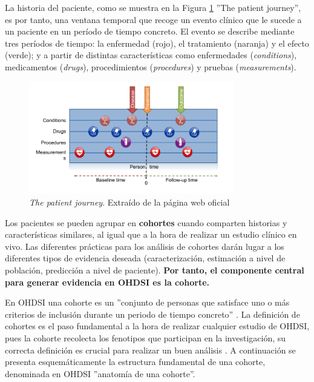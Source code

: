 La historia del paciente,  como se muestra en la Figura \ref{fig:patientJourney} ''The patient journey'', es por tanto, una ventana temporal que recoge un evento clínico que le sucede a un paciente en un período de tiempo concreto. El evento se describe mediante tres períodos de tiempo: la enfermedad (rojo), el tratamiento (naranja) y el efecto (verde); y a partir de distintas características como enfermedades (\textit{conditions}), medicamentos (\textit{drugs}), procedimientos (\textit{procedures}) y pruebas (\textit{measurements}).

\begin{figure}[H]
    \centering
    \includegraphics[width=0.80\textwidth]{figures/patientJourney.png}
     \caption{\textit{The patient journey}. Extraído de la página web oficial \cite{OHDSIbook}}
    \label{fig:patientJourney}
\end{figure}

Los pacientes se pueden agrupar en \textbf{cohortes} cuando comparten historias y características similares, al igual que a la hora de realizar un estudio clínico en vivo. Las diferentes  prácticas para los análisis de cohortes darán lugar a los diferentes tipos de evidencia deseada (caracterización, estimación a nivel de población, predicción a nivel de paciente). \textbf{Por tanto, el componente central para generar evidencia en OHDSI es la cohorte.}


En OHDSI una cohorte es un ''conjunto de personas que satisface uno o más criterios de inclusión durante un periodo de tiempo concreto'' \cite{OHDSIbook}. La definición de cohortes es el paso fundamental a la hora de realizar cualquier estudio de OHDSI, pues la cohorte recolecta los fenotipos que participan en la investigación, su correcta definición es crucial para realizar un buen análisis \cite{hripcsak2018high}. A continuación se presenta esquemáticamente la estructura fundamental de una cohorte, denominada en OHDSI ''anatomía de una cohorte''.

